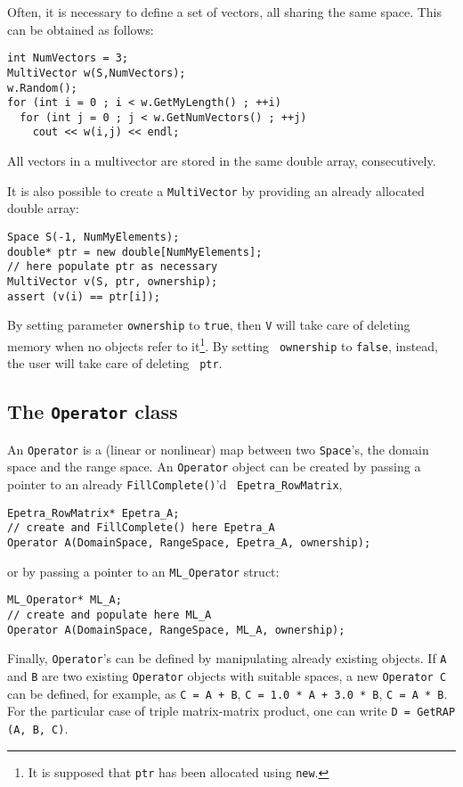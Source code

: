 \documentclass{article}[11pt]
\begin{document}
\smallskip

Often, it is necessary to define a set of vectors, all sharing the same space.
This can be obtained as follows:
\begin{verbatim}
int NumVectors = 3;
MultiVector w(S,NumVectors);
w.Random();
for (int i = 0 ; i < w.GetMyLength() ; ++i)
  for (int j = 0 ; j < w.GetNumVectors() ; ++j)
    cout << w(i,j) << endl;
\end{verbatim}
All vectors in a multivector are stored in the same double array,
  consecutively.

\smallskip

It is also possible to create a {\tt MultiVector} by providing an already
allocated double array:
\begin{verbatim}
Space S(-1, NumMyElements);
double* ptr = new double[NumMyElements];
// here populate ptr as necessary
MultiVector v(S, ptr, ownership);
assert (v(i) == ptr[i]);
\end{verbatim} 
By setting parameter {\tt ownership} to {\tt true}, then {\tt V} will take
care of deleting memory when no objects refer to it\footnote{It is supposed
  that {\tt ptr} has been allocated using {\tt new}.}. By setting {\tt
  ownership} to {\tt false}, instead, the user will take care of deleting {\tt
    ptr}.

\subsection{The {\tt Operator} class}
\label{sec:operator}

An {\tt Operator} is a (linear or nonlinear) map between two {\tt Space}'s, the
domain space and the range space. An {\tt Operator} object can be created
by passing a pointer to an already {\tt FillComplete()}'d {\tt
Epetra\_RowMatrix},
\begin{verbatim}
Epetra_RowMatrix* Epetra_A;
// create and FillComplete() here Epetra_A
Operator A(DomainSpace, RangeSpace, Epetra_A, ownership);
\end{verbatim}
or by passing a pointer to an {\tt ML\_Operator} struct:
\begin{verbatim}
ML_Operator* ML_A;
// create and populate here ML_A
Operator A(DomainSpace, RangeSpace, ML_A, ownership);
\end{verbatim}
Finally, {\tt Operator}'s can be defined 
by manipulating already existing objects. If {\tt A} and {\tt B} are two
existing {\tt Operator} objects with suitable spaces, a new {\tt Operator C}
can be defined, for example, as {\tt C = A
+ B}, {\tt C = 1.0 * A + 3.0 * B}, {\tt C = A * B}. For the particular case of
triple matrix-matrix product, one can write {\tt D = GetRAP (A, B, C)}.
%
\end{document}
